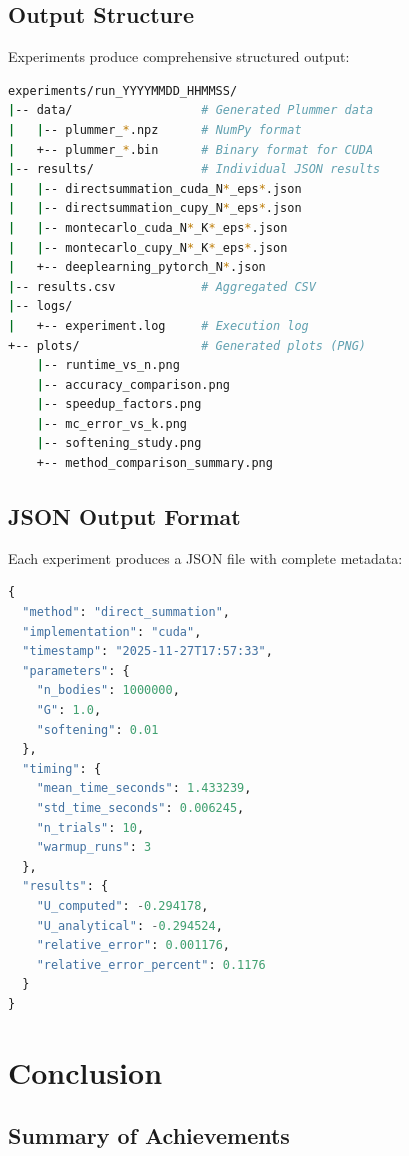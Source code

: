 \documentclass[11pt,a4paper]{article}
\begin{document}
\subsection{Output Structure}

Experiments produce comprehensive structured output:

\begin{lstlisting}[language=bash]
experiments/run_YYYYMMDD_HHMMSS/
|-- data/                  # Generated Plummer data
|   |-- plummer_*.npz      # NumPy format
|   +-- plummer_*.bin      # Binary format for CUDA
|-- results/               # Individual JSON results
|   |-- directsummation_cuda_N*_eps*.json
|   |-- directsummation_cupy_N*_eps*.json
|   |-- montecarlo_cuda_N*_K*_eps*.json
|   |-- montecarlo_cupy_N*_K*_eps*.json
|   +-- deeplearning_pytorch_N*.json
|-- results.csv            # Aggregated CSV
|-- logs/
|   +-- experiment.log     # Execution log
+-- plots/                 # Generated plots (PNG)
    |-- runtime_vs_n.png
    |-- accuracy_comparison.png
    |-- speedup_factors.png
    |-- mc_error_vs_k.png
    |-- softening_study.png
    +-- method_comparison_summary.png
\end{lstlisting}

\subsection{JSON Output Format}

Each experiment produces a JSON file with complete metadata:

\begin{lstlisting}[language=Python, caption={Example JSON structure}]
{
  "method": "direct_summation",
  "implementation": "cuda",
  "timestamp": "2025-11-27T17:57:33",
  "parameters": {
    "n_bodies": 1000000,
    "G": 1.0,
    "softening": 0.01
  },
  "timing": {
    "mean_time_seconds": 1.433239,
    "std_time_seconds": 0.006245,
    "n_trials": 10,
    "warmup_runs": 3
  },
  "results": {
    "U_computed": -0.294178,
    "U_analytical": -0.294524,
    "relative_error": 0.001176,
    "relative_error_percent": 0.1176
  }
}
\end{lstlisting}

\section{Conclusion}

\subsection{Summary of Achievements}
\end{document}
